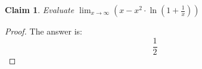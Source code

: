 \documentclass{article}
\newtheorem{theorem}{Claim}
\begin{document}
\begin{theorem}
Evaluate
$ \lim_{x \to \infty} \left(x - x^2 \cdot \ln\left(1 + \frac{ 1 }{ x }\right)\right) $
\end{theorem}

\begin{proof}
The answer is:
\[
\frac{1}{2}
\]
\end{proof}
\end{document}
